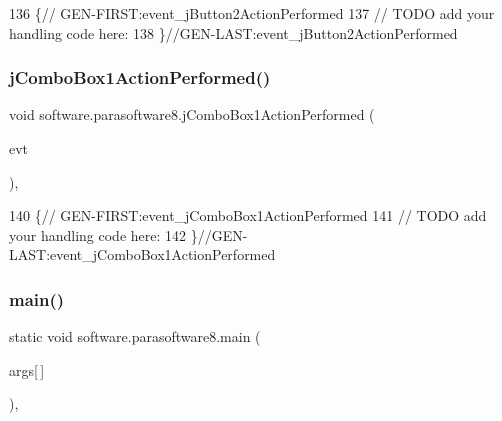 \begin{DoxyCode}
136                                                                          \{\textcolor{comment}{//
      GEN-FIRST:event\_jButton2ActionPerformed}
137         \textcolor{comment}{// TODO add your handling code here:}
138     \}\textcolor{comment}{//GEN-LAST:event\_jButton2ActionPerformed}
\end{DoxyCode}
\mbox{\label{classsoftware_1_1parasoftware8_a6787557a88e95173d633c83413960867}} 
\subsubsection{\texorpdfstring{j\+Combo\+Box1\+Action\+Performed()}{jComboBox1ActionPerformed()}}
{\footnotesize\ttfamily void software.\+parasoftware8.\+j\+Combo\+Box1\+Action\+Performed (\begin{DoxyParamCaption}\item[{java.\+awt.\+event.\+Action\+Event}]{evt }\end{DoxyParamCaption})\hspace{0.3cm}{\ttfamily [inline]}, {\ttfamily [private]}}


\begin{DoxyCode}
140                                                                            \{\textcolor{comment}{//
      GEN-FIRST:event\_jComboBox1ActionPerformed}
141         \textcolor{comment}{// TODO add your handling code here:}
142     \}\textcolor{comment}{//GEN-LAST:event\_jComboBox1ActionPerformed}
\end{DoxyCode}
\mbox{\label{classsoftware_1_1parasoftware8_ac89e30a8f05551ca5de490c2dd5982e3}} 
\subsubsection{\texorpdfstring{main()}{main()}}
{\footnotesize\ttfamily static void software.\+parasoftware8.\+main (\begin{DoxyParamCaption}\item[{String}]{args\mbox{[}$\,$\mbox{]} }\end{DoxyParamCaption})\hspace{0.3cm}{\ttfamily [inline]}, {\ttfamily [static]}}


